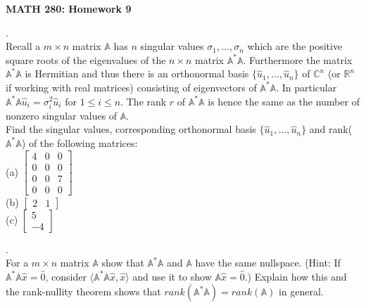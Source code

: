 \documentclass[12 pt]{article}
\begin{document}
\centerline{\bf MATH 280: Homework 9}

\bigskip

. \\ Recall a $m \times n$ matrix $\mathbb{A}$ has $n$ singular values $\sigma_1, \dots, \sigma_n$ which are the 
positive square roots of the eigenvalues of the $n \times n$ matrix $\mathbb{A}^* \mathbb{A}$. Furthermore the matrix $\mathbb{A}^* \mathbb{A}$ is Hermitian and thus there 
is an orthonormal basis $\{ \hat{u}_1, \dots, \hat{u}_n \}$ of $\mathbb{C}^n$ (or $\mathbb{R}^n$ if working with real matrices) consisting of eigenvectors of $\mathbb{A}^*\mathbb{A}$. In particular $\mathbb{A}^*\mathbb{A} \hat{u}_i = \sigma_i^2 \hat{u}_i$ for $1 \leq i \leq n$. The rank $r$ of $\mathbb{A}^* \mathbb{A}$ 
is hence the same as the number of nonzero singular values of $\mathbb{A}$. \\
Find the singular values, corresponding orthonormal basis $\{ \hat{u}_1, \dots, \hat{u}_n \}$ and rank($\mathbb{A}^*\mathbb{A}$) of the following matrices: \\
(a) $\begin{bmatrix} 4 & 0 & 0 \\ 0 & 0 & 0 \\ 0 & 0 & 7 \\ 0 & 0 & 0 \end{bmatrix} $\\

\noindent
(b) $\begin{bmatrix} 2 & 1 \end{bmatrix}$ \\

\noindent
(c) $\begin{bmatrix} 5 \\ - 4 \end{bmatrix} $


\medskip

. \\ For a $m \times n$ matrix $\mathbb{A}$ show that $\mathbb{A}^*\mathbb{A}$ and $\mathbb{A}$ have the same nullspace.
(Hint: If $\mathbb{A}^*\mathbb{A}\hat{x}=\hat{0}$, consider $\langle\mathbb{A}^*\mathbb{A}\hat{x}, \hat{x} \rangle$ and use it to show 
$\mathbb{A}\hat{x}=\hat{0}$.) Explain how this and the rank-nullity theorem shows that $rank(\mathbb{A}^*\mathbb{A})=rank(\mathbb{A})$ in general.

\medskip
\end{document}

